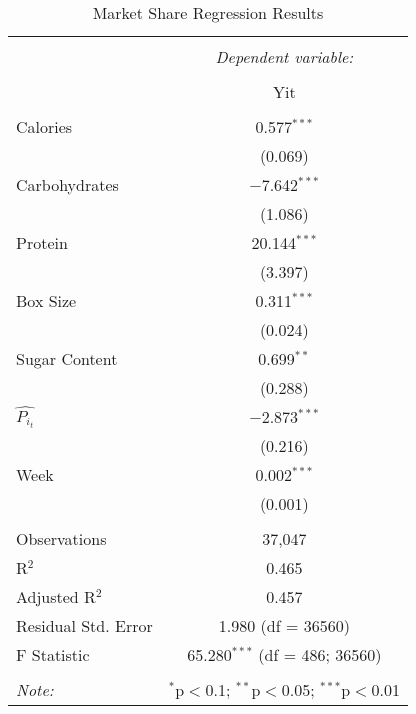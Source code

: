 \documentclass[12pt,english]{article}
\begin{document}
\begin{table}\centering 
  \caption{Market Share Regression Results} 
  \label{} 
\begin{tabular}{@{\extracolsep{5pt}}lc} 
\\[-1.8ex]\hline 
\hline \\[-1.8ex] 
 & \multicolumn{1}{c}{\textit{Dependent variable:}} \\ 
\cline{2-2} 
\\[-1.8ex] & Yit \\ 
\hline \\[-1.8ex] 
 Calories & 0.577$^{***}$ \\ 
  & (0.069) \\ 
 Carbohydrates & $-$7.642$^{***}$ \\ 
  & (1.086) \\ 
 Protein & 20.144$^{***}$ \\ 
  & (3.397) \\ 
 Box Size & 0.311$^{***}$ \\ 
  & (0.024) \\ 
 Sugar Content & 0.699$^{**}$ \\ 
  & (0.288) \\ 
$\widehat{P_i_t }$ & $-$2.873$^{***}$ \\ 
  & (0.216) \\ 
 Week & 0.002$^{***}$ \\ 
  & (0.001) \\ 
\hline \\[-1.8ex] 
Observations & 37,047 \\ 
R$^{2}$ & 0.465 \\ 
Adjusted R$^{2}$ & 0.457 \\ 
Residual Std. Error & 1.980 (df = 36560) \\ 
F Statistic & 65.280$^{***}$ (df = 486; 36560) \\ 
\hline 
\hline \\[-1.8ex] 
\textit{Note:}  & \multicolumn{1}{r}{$^{*}$p$<$0.1; $^{**}$p$<$0.05; $^{***}$p$<$0.01} \\ 
\end{tabular} 
\end{table}
\end{document}
